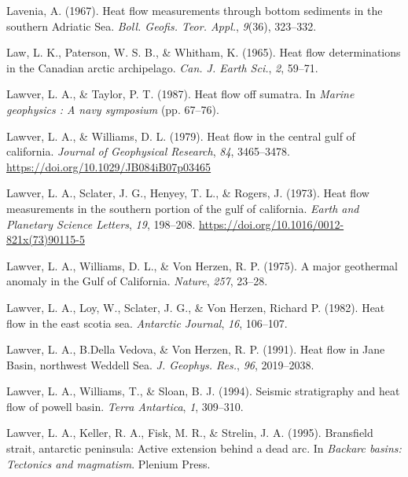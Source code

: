 \begin{CSLReferences}{1}{1}
\leavevmode{}%
Lavenia, A. (1967). Heat flow measurements through bottom sediments in the southern {Adriatic Sea}. \emph{Boll. Geofis. Teor. Appl.}, \emph{9}(36), 323--332.

\leavevmode{}%
Law, L. K., Paterson, W. S. B., \& Whitham, K. (1965). Heat flow determinations in the {Canadian} arctic archipelago. \emph{Can. J. Earth Sci.}, \emph{2}, 59--71.

\leavevmode{}%
Lawver, L. A., \& Taylor, P. T. (1987). Heat flow off sumatra. In \emph{Marine geophysics : A navy symposium} (pp. 67--76).

\leavevmode{}%
Lawver, L. A., \& Williams, D. L. (1979). Heat flow in the central gulf of california. \emph{Journal of Geophysical Research}, \emph{84}, 3465--3478. \url{https://doi.org/10.1029/JB084iB07p03465}

\leavevmode{}%
Lawver, L. A., Sclater, J. G., Henyey, T. L., \& Rogers, J. (1973). Heat flow measurements in the southern portion of the gulf of california. \emph{Earth and Planetary Science Letters}, \emph{19}, 198--208. \url{https://doi.org/10.1016/0012-821x(73)90115-5}

\leavevmode{}%
Lawver, L. A., Williams, D. L., \& Von Herzen, R. P. (1975). A major geothermal anomaly in the {Gulf of California}. \emph{Nature}, \emph{257}, 23--28.

\leavevmode{}%
Lawver, L. A., Loy, W., Sclater, J. G., \& Von Herzen, Richard P. (1982). Heat flow in the east scotia sea. \emph{Antarctic Journal}, \emph{16}, 106--107.

\leavevmode{}%
Lawver, L. A., B.Della Vedova, \& Von Herzen, R. P. (1991). Heat flow in {Jane Basin}, northwest {Weddell Sea}. \emph{J. Geophys. Res.}, \emph{96}, 2019--2038.

\leavevmode{}%
Lawver, L. A., Williams, T., \& Sloan, B. J. (1994). Seismic stratigraphy and heat flow of powell basin. \emph{Terra Antartica}, \emph{1}, 309--310.

\leavevmode{}%
Lawver, L. A., Keller, R. A., Fisk, M. R., \& Strelin, J. A. (1995). Bransfield strait, antarctic peninsula: Active extension behind a dead arc. In \emph{Backarc basins: Tectonics and magmatism}. Plenium Press.


\end{CSLReferences}
